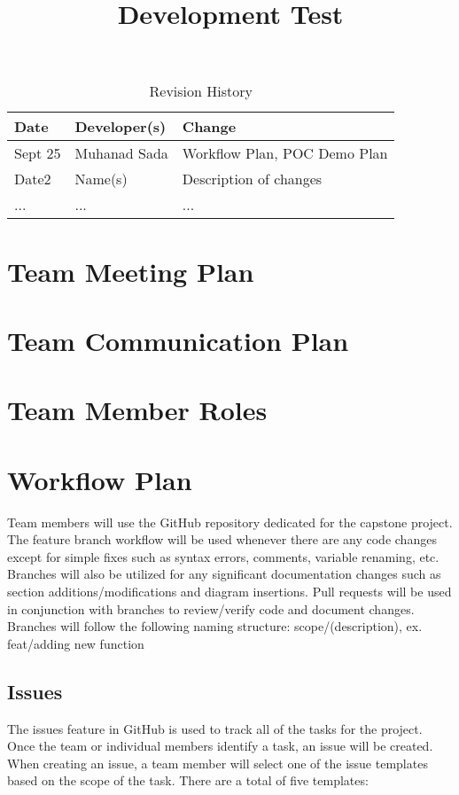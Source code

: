 \documentclass{article}
\title{Development Test\\\progname}
\author{\authname}
\date{}
\begin{document}
\begin{table}[hp]
\caption{Revision History} \label{TblRevisionHistory}
\begin{tabularx}{\textwidth}{llX}
\toprule
\textbf{Date} & \textbf{Developer(s)} & \textbf{Change}\\
\midrule
Sept 25 & Muhanad Sada & Workflow Plan, POC Demo Plan\\
Date2 & Name(s) & Description of changes\\
... & ... & ...\\
\bottomrule
\end{tabularx}
\end{table}

\newpage

\maketitle


\section{Team Meeting Plan}

\section{Team Communication Plan}

\section{Team Member Roles}

\section{Workflow Plan}
Team members will use the GitHub repository dedicated for the capstone project. The feature
branch workflow will be used whenever there are any code changes except for simple fixes such as syntax errors, comments, variable renaming, etc. 
Branches will also be utilized for any significant documentation changes such as section additions/modifications and diagram insertions. 
Pull requests will be used in conjunction with branches to review/verify code and document changes.
Branches will follow the following naming structure: scope/(description), ex. feat/adding new function

\subsection{Issues}
The issues feature in GitHub is used to track all of the tasks for the project. Once the team or individual members 
identify a task, an issue will be created. When creating an issue, a team member will select one of the issue templates 
based on the scope of the task. There are a total of five templates:
\end{document}
